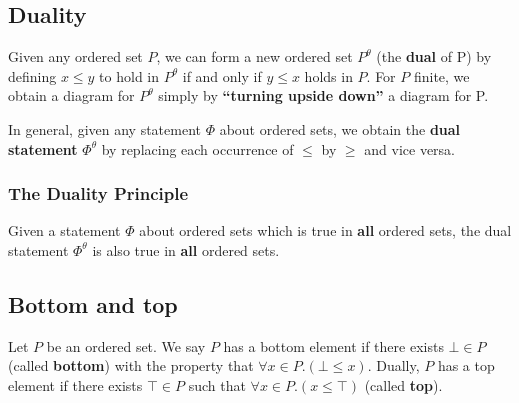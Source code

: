 \documentclass[12pt, letterpaper, oneside]{book}
\begin{document}
\subsection{Duality}

Given any ordered set $P$, we can form a new ordered set $P^{\theta}$ (the \textbf{dual} of P) by defining $x \leqslant y$
to hold in $P^{\theta}$ if and only if $y \leqslant x$ holds in $P$. For $P$ finite, we obtain a diagram for $P^{\theta}$
simply by \textbf{``turning upside down''} a diagram for P.

In general, given any statement $\Phi$ about ordered sets, we obtain the \textbf{dual statement} $\Phi^{\theta}$ by
replacing each occurrence of $\leqslant$ by $\geqslant$ and vice versa.

\subsubsection{The Duality Principle}

Given a statement $\Phi$ about ordered sets which is true in \textbf{all} ordered sets, the dual statement $\Phi^{\theta}$
is also true in \textbf{all} ordered sets.

\subsection{Bottom and top}

Let $P$ be an ordered set. We say $P$ has a bottom element if there exists $\bot \in P$ (called \textbf{bottom}) with
the property that $\forall x \in P. (\bot \leqslant x)$. Dually, $P$ has a top element if there exists $\top \in P$
such that $\forall x \in P. (x \leqslant \top)$ (called \textbf{top}).
\end{document}
